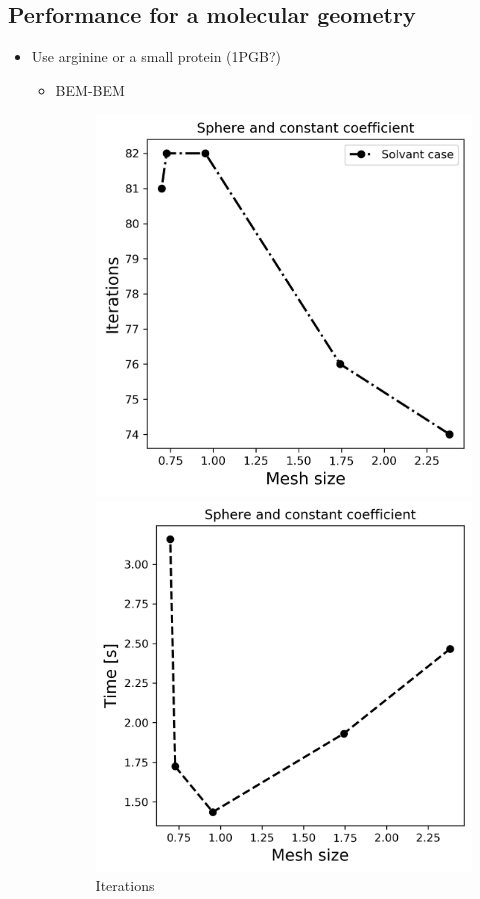 \subsection*{\sffamily \large Performance for a molecular geometry}
\begin{itemize}
    \item Use arginine or a small protein (1PGB?)
    \begin{itemize}
        \item BEM-BEM
\begin{figure}[!htb]
  \includegraphics[width=\linewidth]{BEM_BEM_Arginine_const_coeff_iter.png}
  \caption{Iterations}
\endminipage\hfill
{}%
  \includegraphics[width=\linewidth]{BEM_BEM_Arginine_const_coeff_time.png}

\end{figure}
\end{itemize}
\end{itemize}
